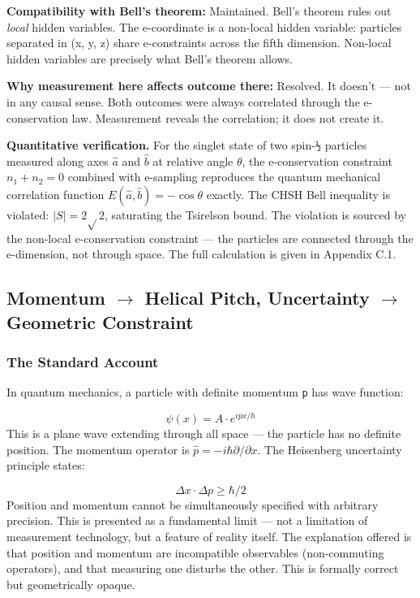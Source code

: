\documentclass[aps,prd,preprint,superscriptaddress,longbibliography,floatfix]{revtex4-2}
\theoremstyle{remark}
\begin{document}
\textbf{Compatibility with Bell's theorem:} Maintained. Bell's theorem rules out \textit{local} hidden variables. The e-coordinate is a non-local hidden variable: particles separated in (x, y, z) share e-constraints across the fifth dimension. Non-local hidden variables are precisely what Bell's theorem allows.

\textbf{Why measurement here affects outcome there:} Resolved. It doesn't --- not in any causal sense. Both outcomes were always correlated through the e-conservation law. Measurement reveals the correlation; it does not create it.

\textbf{Quantitative verification.} For the singlet state of two spin-\texttt{½} particles measured along axes $\hat{a}$ and \texttt{$\hat{b}$} at relative angle $\theta$, the e-conservation constraint $n_{1} + n_{2} = 0$ combined with e-sampling reproduces the quantum mechanical correlation function $E(\hat{a}, \hat{b}) = -\cos \theta$ exactly. The CHSH Bell inequality is violated: $|S| = 2\sqrt{}2$, saturating the Tsirelson bound. The violation is sourced by the non-local e-conservation constraint --- the particles are connected through the e-dimension, not through space. The full calculation is given in Appendix C.1.



\subsection{Momentum $\to$ Helical Pitch, Uncertainty $\to$ Geometric Constraint}


\subsubsection{The Standard Account}

In quantum mechanics, a particle with definite momentum \texttt{p} has wave function:


\begin{equation}
    \psi(x) = A \cdot e^{ipx/\hbar}
\end{equation}
This is a plane wave extending through all space --- the particle has no definite position. The momentum operator is $\hat{p} = -i\hbar \partial/\partial x$. The Heisenberg uncertainty principle states:


\begin{equation}
    \Delta x \cdot \Delta p \geq \hbar/2
\end{equation}
Position and momentum cannot be simultaneously specified with arbitrary precision. This is presented as a fundamental limit --- not a limitation of measurement technology, but a feature of reality itself. The explanation offered is that position and momentum are incompatible observables (non-commuting operators), and that measuring one disturbs the other. This is formally correct but geometrically opaque.
\end{document}
